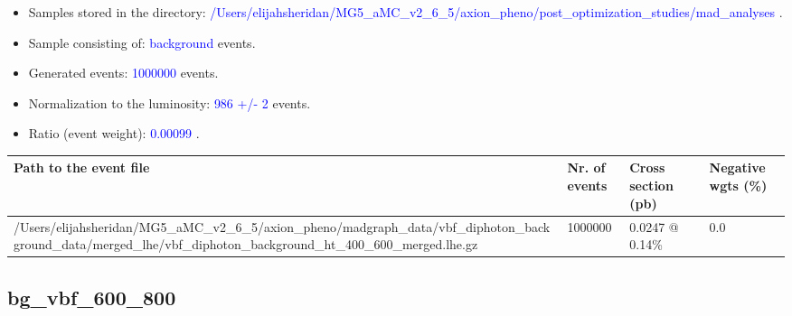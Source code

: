 \documentclass[a4paper, 10pt]{article}
\begin{document}
\begin{itemize}
  \item Samples stored in the directory: \textcolor{blue}{/\-Users/\-elijahsheridan/\-MG5\_aMC\_v2\_6\_5/\-axion\_pheno/\-post\_optimization\_studies/\-mad\_analyses} .
   \item Sample consisting of: \textcolor{blue}{background}  events.
   \item Generated events: \textcolor{blue}{1000000 }  events.
   \item Normalization to the luminosity: \textcolor{blue}{986}\textcolor{blue}{ +/\-- }\textcolor{blue}{2 }  events.
   \item Ratio (event weight): \textcolor{blue}{0.00099 } .  
 
\end{itemize}
\begin{table}[H]
  \begin{center}
    \begin{tabular}{|m{55.0mm}|m{25.0mm}|m{30.0mm}|m{30.0mm}|}
      \hline
      {\cellcolor{yellow}         Path to the event file}& {\cellcolor{yellow}         Nr. of events}& {\cellcolor{yellow}         Cross section (pb)}& {\cellcolor{yellow}         Negative wgts (\%)}\\
      \hline
      {\cellcolor{white}          /\-Users/\-elijahsheridan/\-MG5\_aMC\_v2\_6\_5/\-axion\_pheno/\-madgraph\_data/\-vbf\_diphoton\_background\_data/\-merged\_lhe/\-vbf\_diphoton\_background\_ht\_400\_600\_merged.lhe.gz}& {\cellcolor{white}          1000000}& {\cellcolor{white}          0.0247 @ 0.14\%}& {\cellcolor{white}          0.0}\\
\hline
    \end{tabular}
  \end{center}
\end{table}

\subsection{ bg\_vbf\_600\_800}
\end{document}
